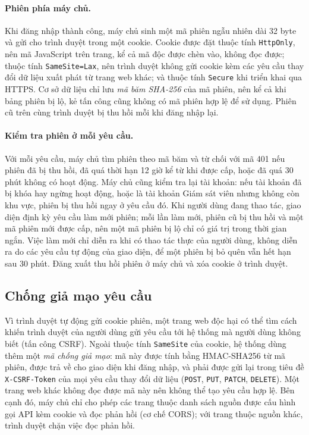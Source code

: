 \paragraph{Phiên phía máy chủ.} Khi đăng nhập thành công, máy chủ sinh một mã phiên ngẫu nhiên dài 32 byte và gửi cho trình duyệt trong một cookie. Cookie được đặt thuộc tính \texttt{HttpOnly}, nên mã JavaScript trên trang, kể cả mã độc được chèn vào, không đọc được; thuộc tính \texttt{SameSite=Lax}, nên trình duyệt không gửi cookie kèm các yêu cầu thay đổi dữ liệu xuất phát từ trang web khác; và thuộc tính \texttt{Secure} khi triển khai qua HTTPS. Cơ sở dữ liệu chỉ lưu \emph{mã băm SHA-256} của mã phiên, nên kể cả khi bảng phiên bị lộ, kẻ tấn công cũng không có mã phiên hợp lệ để sử dụng. Phiên cũ trên cùng trình duyệt bị thu hồi mỗi khi đăng nhập lại.

\paragraph{Kiểm tra phiên ở mỗi yêu cầu.} Với mỗi yêu cầu, máy chủ tìm phiên theo mã băm và từ chối với mã 401 nếu phiên đã bị thu hồi, đã quá thời hạn 12 giờ kể từ khi được cấp, hoặc đã quá 30 phút không có hoạt động. Máy chủ cũng kiểm tra lại tài khoản: nếu tài khoản đã bị khóa hay ngừng hoạt động, hoặc là tài khoản Giám sát viên nhưng không còn khu vực, phiên bị thu hồi ngay ở yêu cầu đó. Khi người dùng đang thao tác, giao diện định kỳ yêu cầu làm mới phiên; mỗi lần làm mới, phiên cũ bị thu hồi và một mã phiên mới được cấp, nên một mã phiên bị lộ chỉ có giá trị trong thời gian ngắn. Việc làm mới chỉ diễn ra khi có thao tác thực của người dùng, không diễn ra do các yêu cầu tự động của giao diện, để một phiên bị bỏ quên vẫn hết hạn sau 30 phút. Đăng xuất thu hồi phiên ở máy chủ và xóa cookie ở trình duyệt.

\subsection{Chống giả mạo yêu cầu}
\label{sec:5.5.2}

Vì trình duyệt tự động gửi cookie phiên, một trang web độc hại có thể tìm cách khiến trình duyệt của người dùng gửi yêu cầu tới hệ thống mà người dùng không biết (tấn công CSRF). Ngoài thuộc tính \texttt{SameSite} của cookie, hệ thống dùng thêm một \emph{mã chống giả mạo}: mã này được tính bằng HMAC-SHA256 từ mã phiên, được trả về cho giao diện khi đăng nhập, và phải được gửi lại trong tiêu đề \texttt{X-CSRF-Token} của mọi yêu cầu thay đổi dữ liệu (\texttt{POST}, \texttt{PUT}, \texttt{PATCH}, \texttt{DELETE}). Một trang web khác không đọc được mã này nên không thể tạo yêu cầu hợp lệ. Bên cạnh đó, máy chủ chỉ cho phép các trang thuộc danh sách nguồn được cấu hình gọi API kèm cookie và đọc phản hồi (cơ chế CORS); với trang thuộc nguồn khác, trình duyệt chặn việc đọc phản hồi.

